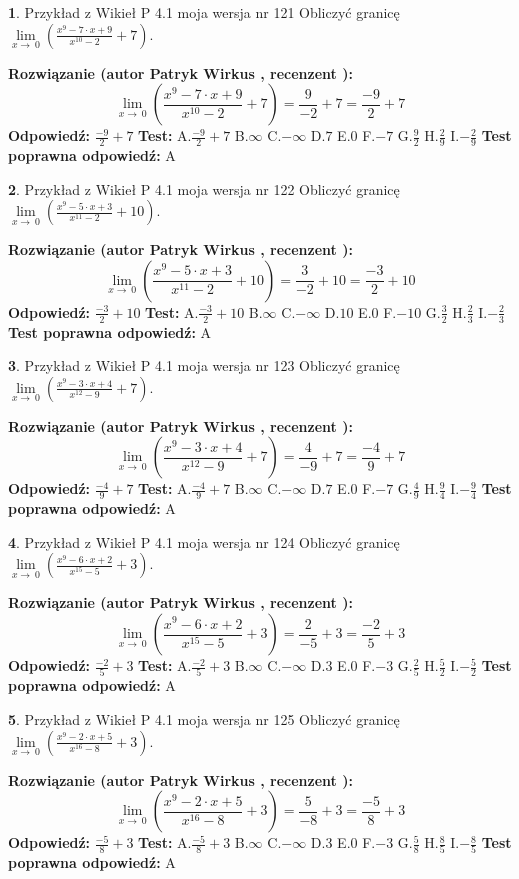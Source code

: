 \documentclass[12pt, a4paper]{article}
\theoremstyle{definition} %
\newtheorem{zad}{}
\newcommand{\zadStart}[1]{\begin{zad}#1\newline}
\newcommand{\zadStop}{\end{zad}}
\newcommand{\rozwStart}[2]{\noindent \textbf{Rozwiązanie (autor #1 , recenzent #2): }\newline}
\newcommand{\rozwStop}{\newline}
\newcommand{\odpStart}{\noindent \textbf{Odpowiedź:}\newline}
\newcommand{\odpStop}{\newline}
\newcommand{\testStart}{\noindent \textbf{Test:}\newline}
\newcommand{\testStop}{\newline}
\newcommand{\kluczStart}{\noindent \textbf{Test poprawna odpowiedź:}\newline}
\newcommand{\kluczStop}{\newline}
\begin{document}
\zadStart{Przykład z Wikieł P 4.1 moja wersja nr 121}
Obliczyć granicę $\lim\limits_{x\to\ 0}(\frac{x^{9}-7 \cdot x +9}{x^{10}-2}+7)$.
\zadStop
\rozwStart{Patryk Wirkus}{}
$$\lim\limits_{x\to\ 0}(\frac{x^{9}-7 \cdot x +9}{x^{10}-2}+7)=\frac{9}{-2}+7=\frac{-9}{2}+7$$
\rozwStop
\odpStart
$\frac{-9}{2}+7$
\odpStop
\testStart
A.$\frac{-9}{2}+7$
B.$\infty$
C.$-\infty$
D.$7$
E.$0$
F.$-7$
G.$\frac{9}{2}$
H.$\frac{2}{9}$
I.$-\frac{2}{9}$
\testStop
\kluczStart
A
\kluczStop



\zadStart{Przykład z Wikieł P 4.1 moja wersja nr 122}
Obliczyć granicę $\lim\limits_{x\to\ 0}(\frac{x^{9}-5 \cdot x +3}{x^{11}-2}+10)$.
\zadStop
\rozwStart{Patryk Wirkus}{}
$$\lim\limits_{x\to\ 0}(\frac{x^{9}-5 \cdot x +3}{x^{11}-2}+10)=\frac{3}{-2}+10=\frac{-3}{2}+10$$
\rozwStop
\odpStart
$\frac{-3}{2}+10$
\odpStop
\testStart
A.$\frac{-3}{2}+10$
B.$\infty$
C.$-\infty$
D.$10$
E.$0$
F.$-10$
G.$\frac{3}{2}$
H.$\frac{2}{3}$
I.$-\frac{2}{3}$
\testStop
\kluczStart
A
\kluczStop



\zadStart{Przykład z Wikieł P 4.1 moja wersja nr 123}
Obliczyć granicę $\lim\limits_{x\to\ 0}(\frac{x^{9}-3 \cdot x +4}{x^{12}-9}+7)$.
\zadStop
\rozwStart{Patryk Wirkus}{}
$$\lim\limits_{x\to\ 0}(\frac{x^{9}-3 \cdot x +4}{x^{12}-9}+7)=\frac{4}{-9}+7=\frac{-4}{9}+7$$
\rozwStop
\odpStart
$\frac{-4}{9}+7$
\odpStop
\testStart
A.$\frac{-4}{9}+7$
B.$\infty$
C.$-\infty$
D.$7$
E.$0$
F.$-7$
G.$\frac{4}{9}$
H.$\frac{9}{4}$
I.$-\frac{9}{4}$
\testStop
\kluczStart
A
\kluczStop



\zadStart{Przykład z Wikieł P 4.1 moja wersja nr 124}
Obliczyć granicę $\lim\limits_{x\to\ 0}(\frac{x^{9}-6 \cdot x +2}{x^{15}-5}+3)$.
\zadStop
\rozwStart{Patryk Wirkus}{}
$$\lim\limits_{x\to\ 0}(\frac{x^{9}-6 \cdot x +2}{x^{15}-5}+3)=\frac{2}{-5}+3=\frac{-2}{5}+3$$
\rozwStop
\odpStart
$\frac{-2}{5}+3$
\odpStop
\testStart
A.$\frac{-2}{5}+3$
B.$\infty$
C.$-\infty$
D.$3$
E.$0$
F.$-3$
G.$\frac{2}{5}$
H.$\frac{5}{2}$
I.$-\frac{5}{2}$
\testStop
\kluczStart
A
\kluczStop



\zadStart{Przykład z Wikieł P 4.1 moja wersja nr 125}
Obliczyć granicę $\lim\limits_{x\to\ 0}(\frac{x^{9}-2 \cdot x +5}{x^{16}-8}+3)$.
\zadStop
\rozwStart{Patryk Wirkus}{}
$$\lim\limits_{x\to\ 0}(\frac{x^{9}-2 \cdot x +5}{x^{16}-8}+3)=\frac{5}{-8}+3=\frac{-5}{8}+3$$
\rozwStop
\odpStart
$\frac{-5}{8}+3$
\odpStop
\testStart
A.$\frac{-5}{8}+3$
B.$\infty$
C.$-\infty$
D.$3$
E.$0$
F.$-3$
G.$\frac{5}{8}$
H.$\frac{8}{5}$
I.$-\frac{8}{5}$
\testStop
\kluczStart
A
\kluczStop
\end{document}
